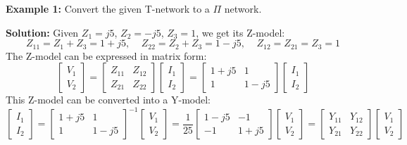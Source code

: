 \documentclass{article}
\begin{document}
{\bf Example 1:} Convert the given T-network to a $\Pi$ network.


{\bf Solution:} Given $Z_1=j5$, $Z_2=-j5$, $Z_3=1$, we get its Z-model:
\begin{equation} 
  Z_{11}=Z_1+Z_3=1+j5,\;\;\;\;Z_{22}=Z_2+Z_3=1-j5,\;\;\;\;Z_{12}=Z_{21}=Z_3=1 
\end{equation}
The Z-model can be expressed in matrix form:
\begin{equation}	
  \left[ \begin{array}{l} V_1 \\ V_2\end{array} \right]=
  \left[ \begin{array}{cc} Z_{11} & Z_{12} \\ Z_{21} & Z_{22} \end{array} \right]
  \left[ \begin{array}{l} I_1 \\ I_2\end{array} \right]
  =	\left[ \begin{array}{cc} 1+j5 & 1 \\ 1 & 1-j5 \end{array} \right]
  \left[ \begin{array}{l} I_1 \\ I_2\end{array} \right]
\end{equation}
This Z-model can be converted into a Y-model:
\begin{equation}
  \left[ \begin{array}{l} I_1 \\ I_2\end{array} \right]=
  \left[ \begin{array}{cc} 1+j5 & 1 \\ 1 & 1-j5 \end{array} \right]^{-1}
  \left[ \begin{array}{l} V_1 \\ V_2\end{array} \right]
  =\frac{1}{25}
  \left[ \begin{array}{cc} 1-j5 & -1 \\ -1 & 1+j5 \end{array} \right]
  \left[ \begin{array}{l} V_1 \\ V_2\end{array} \right]
  =	\left[ \begin{array}{cc} Y_{11} & Y_{12} \\ Y_{21} & Y_{22} \end{array} \right]
  \left[ \begin{array}{l} V_1 \\ V_2\end{array} \right]
\end{equation}
\end{document}
